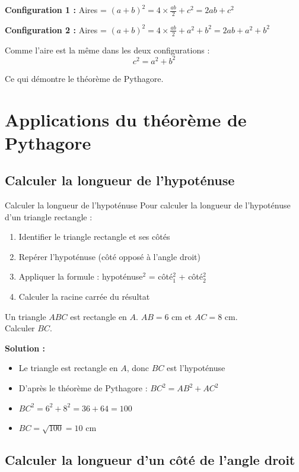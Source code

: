 \textbf{Configuration 1 :} Aires = $(a+b)^2 = 4 \times \frac{ab}{2} + c^2 = 2ab + c^2$

\textbf{Configuration 2 :} Aires = $(a+b)^2 = 4 \times \frac{ab}{2} + a^2 + b^2 = 2ab + a^2 + b^2$

Comme l'aire est la même dans les deux configurations :
\[c^2 = a^2 + b^2\]

Ce qui démontre le théorème de Pythagore.

\section{Applications du théorème de Pythagore}

\subsection{Calculer la longueur de l'hypoténuse}

\begin{methode}{Calculer la longueur de l'hypoténuse}
Pour calculer la longueur de l'hypoténuse d'un triangle rectangle :
\begin{enumerate}
    \item Identifier le triangle rectangle et ses côtés
    \item Repérer l'hypoténuse (côté opposé à l'angle droit)
    \item Appliquer la formule : hypoténuse$^2$ = côté$_1^2$ + côté$_2^2$
    \item Calculer la racine carrée du résultat
\end{enumerate}
\end{methode}

\begin{exemple}
Un triangle $ABC$ est rectangle en $A$. $AB = 6$ cm et $AC = 8$ cm.\\
Calculer $BC$.

\textbf{Solution :}
\begin{itemize}
    \item Le triangle est rectangle en $A$, donc $BC$ est l'hypoténuse
    \item D'après le théorème de Pythagore : $BC^2 = AB^2 + AC^2$
    \item $BC^2 = 6^2 + 8^2 = 36 + 64 = 100$
    \item $BC = \sqrt{100} = 10$ cm
\end{itemize}
\end{exemple}

\subsection{Calculer la longueur d'un côté de l'angle droit}


